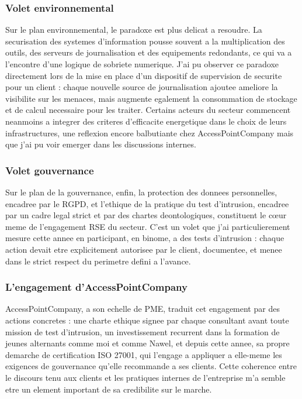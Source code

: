 \documentclass[11pt,a4paper]{article}
\begin{document}
\subsubsection*{Volet environnemental}

Sur le plan environnemental, le paradoxe est plus delicat a resoudre. La securisation des systemes d'information pousse souvent a la multiplication des outils, des serveurs de journalisation et des equipements redondants, ce qui va a l'encontre d'une logique de sobriete numerique. J'ai pu observer ce paradoxe directement lors de la mise en place d'un dispositif de supervision de securite pour un client : chaque nouvelle source de journalisation ajoutee ameliore la visibilite sur les menaces, mais augmente egalement la consommation de stockage et de calcul necessaire pour les traiter. Certains acteurs du secteur commencent neanmoins a integrer des criteres d'efficacite energetique dans le choix de leurs infrastructures, une reflexion encore balbutiante chez AccessPointCompany mais que j'ai pu voir emerger dans les discussions internes.

\subsubsection*{Volet gouvernance}

Sur le plan de la gouvernance, enfin, la protection des donnees personnelles, encadree par le RGPD, et l'ethique de la pratique du test d'intrusion, encadree par un cadre legal strict et par des chartes deontologiques, constituent le c\oe ur meme de l'engagement RSE du secteur. C'est un volet que j'ai particulierement mesure cette annee en participant, en binome, a des tests d'intrusion : chaque action devait etre explicitement autorisee par le client, documentee, et menee dans le strict respect du perimetre defini a l'avance.

\subsubsection*{L'engagement d'AccessPointCompany}

AccessPointCompany, a son echelle de PME, traduit cet engagement par des actions concretes : une charte ethique signee par chaque consultant avant toute mission de test d'intrusion, un investissement recurrent dans la formation de jeunes alternants comme moi et comme Nawel, et depuis cette annee, sa propre demarche de certification ISO 27001, qui l'engage a appliquer a elle-meme les exigences de gouvernance qu'elle recommande a ses clients. Cette coherence entre le discours tenu aux clients et les pratiques internes de l'entreprise m'a semble etre un element important de sa credibilite sur le marche.
\end{document}
